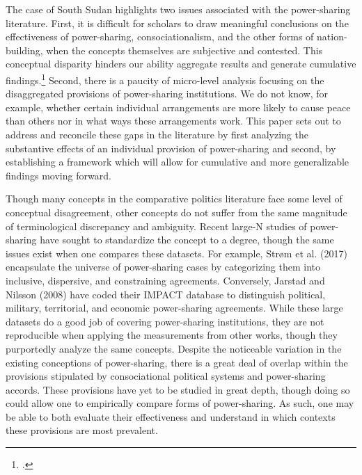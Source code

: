 \documentclass[12pt]{article}
\begin{document}
The case of South Sudan highlights two issues associated with the power-sharing literature. First, it is difficult for scholars to draw meaningful conclusions on the effectiveness of power-sharing, consociationalism, and the other forms of nation-building, when the concepts themselves are subjective and contested. This conceptual disparity hinders our ability aggregate results and generate cumulative findings.\footcite{dunning_information_2020} Second, there is a paucity of micro-level analysis focusing on the disaggregated provisions of power-sharing institutions. We do not know, for example, whether certain individual arrangements are more likely to cause peace than others nor in what ways these arrangements work. This paper sets out to address and reconcile these gaps in the literature by first analyzing the substantive effects of an individual provision of power-sharing and second, by establishing a framework which will allow for cumulative and more generalizable findings moving forward. 

Though many concepts in the comparative politics literature face some level of conceptual disagreement, other concepts do not suffer from the same magnitude of terminological discrepancy and ambiguity. Recent large-N studies of power-sharing have sought to standardize the concept to a degree, though the same issues exist when one compares these datasets. For example, Strøm et al. (2017) encapsulate the universe of power-sharing cases by categorizing them into inclusive, dispersive, and constraining agreements. Conversely, Jarstad and Nilsson (2008) have coded their IMPACT database to distinguish political, military, territorial, and economic power-sharing agreements. While these large datasets do a good job of covering power-sharing institutions, they are not reproducible when applying the measurements from other works, though they purportedly analyze the same concepts. Despite the noticeable variation in the existing conceptions of power-sharing, there is a great deal of overlap within the provisions stipulated by consociational political systems and power-sharing accords. These provisions have yet to be studied in great depth, though doing so could allow one to empirically compare forms of power-sharing. As such, one may be able to both evaluate their effectiveness and understand in which contexts these provisions are most prevalent. 
\end{document}
